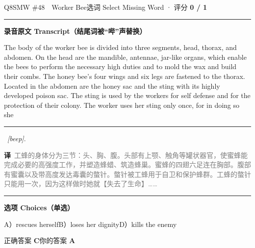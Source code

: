 \documentclass[11pt]{article}
\newcommand{\ptesub}[1]{%
  \par\needspace{2\baselineskip}\smallskip
  {\color{cAccent}\rule[-0.2ex]{3pt}{1.05em}}\hspace{6pt}%
  {\bfseries\color{cHead}#1}\par\nopagebreak\smallskip}
\newcommand{\zh}[1]{{\footnotesize\textcolor{cNote}{\textbf{译}}\ \textcolor{gray}{#1}}}
\begin{document}
\begin{qblock}{Q8\quad SMW \#48\ \ Worker Bee}{选词 Select Missing Word · 评分 \textcolor{cAccent}{\bfseries 0 / 1}}
\ptesub{录音原文 Transcript（结尾词被“哔”声替换）}
\begin{promptbox}
The body of the worker bee is divided into three segments, head, thorax, and abdomen. On the head are the mandible, antennae, jar-like organs, which enable the bees to perform the necessary high duties and to mold the wax and build their combs. The honey bee's four wings and six legs are fastened to the thorax. Located in the abdomen are the honey sac and the sting with its highly developed poison sac. The sting is used by the workers for self defense and for the protection of their colony. The worker uses her sting only once, for in doing so she \rule{1.2cm}{0.4pt}\ \textit{[beep]}.
\end{promptbox}
\zh{工蜂的身体分为三节：头、胸、腹。头部有上颚、触角等罐状器官，使蜜蜂能完成必要的高强度工作，并塑造蜂蜡、筑造蜂巢。蜜蜂的四翅六足连在胸部。腹部有蜜囊以及带高度发达毒囊的螫针。螫针被工蜂用于自卫和保护蜂群。工蜂的螫针只能用一次，因为这样做时她就【失去了生命】……}
\ptesub{选项 Choices（单选）}
{\small A）rescues herself\quad B）loses her dignity\quad D）kills the enemy}
\smallskip\par
{\small 正确答案 \textcolor{cFix}{\bfseries C}\qquad 你的答案 {\color{cWrong}\bfseries A}}
\end{qblock}
\end{document}
